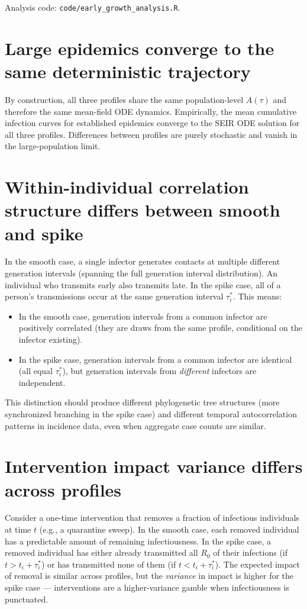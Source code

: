 \documentclass[11pt]{article}
\begin{document}
Analysis code: \texttt{code/early\_growth\_analysis.R}.

\section{Large epidemics converge to the same deterministic trajectory}

By construction, all three profiles share the same population-level $A(\tau)$ and therefore the same mean-field ODE dynamics. Empirically, the mean cumulative infection curves for established epidemics converge to the SEIR ODE solution for all three profiles. Differences between profiles are purely stochastic and vanish in the large-population limit.

\section{Within-individual correlation structure differs between smooth and spike}

In the smooth case, a single infector generates contacts at multiple different generation intervals (spanning the full generation interval distribution). An individual who transmits early also transmits late. In the spike case, all of a person's transmissions occur at the same generation interval $\tau_i^*$. This means:

\begin{itemize}
\item In the smooth case, generation intervals from a common infector are positively correlated (they are draws from the same profile, conditional on the infector existing).
\item In the spike case, generation intervals from a common infector are identical (all equal $\tau_i^*$), but generation intervals from \textit{different} infectors are independent.
\end{itemize}

This distinction should produce different phylogenetic tree structures (more synchronized branching in the spike case) and different temporal autocorrelation patterns in incidence data, even when aggregate case counts are similar.

\section{Intervention impact variance differs across profiles}

Consider a one-time intervention that removes a fraction of infectious individuals at time $t$ (e.g., a quarantine sweep). In the smooth case, each removed individual has a predictable amount of remaining infectiousness. In the spike case, a removed individual has either already transmitted all $R_0$ of their infections (if $t > t_i + \tau_i^*$) or has transmitted none of them (if $t < t_i + \tau_i^*$). The expected impact of removal is similar across profiles, but the \textit{variance} in impact is higher for the spike case --- interventions are a higher-variance gamble when infectiousness is punctuated.
\end{document}
